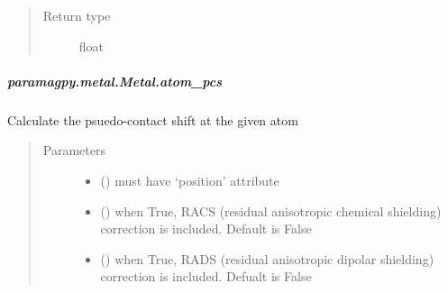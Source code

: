 \documentclass[a4paper,10pt,english,openany,oneside]{sphinxmanual}
\begin{document}
\begin{fulllineitems}
\begin{fulllineitems}
\begin{fulllineitems}
\begin{quote}
\begin{description}
\item[{Return type}] \leavevmode
float

\end{description}\end{quote}

\end{fulllineitems}



\subparagraph{paramagpy.metal.Metal.atom\_pcs}
\label{\detokenize{reference/generated/paramagpy.metal.Metal.atom_pcs:paramagpy-metal-metal-atom-pcs}}\label{\detokenize{reference/generated/paramagpy.metal.Metal.atom_pcs::doc}}

\begin{fulllineitems}
\label{\detokenize{reference/generated/paramagpy.metal.Metal.atom_pcs:paramagpy.metal.Metal.atom_pcs}}
Calculate the psuedo-contact shift at the given atom
\begin{quote}\begin{description}
\item[{Parameters}] \leavevmode\begin{itemize}
\item {} 
 () \textendash{} must have ‘position’ attribute

\item {} 
 (\sphinxstyleliteralemphasis{\sphinxupquote{ (}}\sphinxstyleliteralemphasis{\sphinxupquote{)}}) \textendash{} when True, RACS (residual anisotropic chemical shielding)
correction is included. Default is False

\item {} 
 (\sphinxstyleliteralemphasis{\sphinxupquote{ (}}\sphinxstyleliteralemphasis{\sphinxupquote{)}}) \textendash{} when True, RADS (residual anisotropic dipolar shielding)
correction is included. Defualt is False

\end{itemize}


\end{description}
\end{quote}
\end{fulllineitems}
\end{fulllineitems}
\end{fulllineitems}
\end{document}
